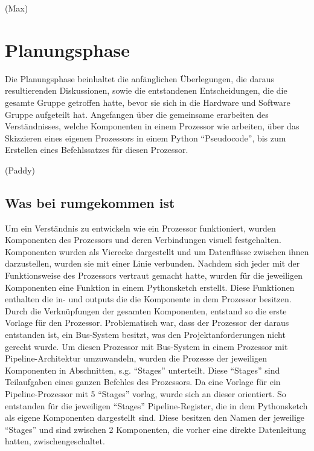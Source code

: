 \documentclass[paper=a4,fontsize=12pt,twocolumn]{scrreprt}
\begin{document}

(Max)

\chapter{Planungsphase}
\label{chap:Planungsphase}

Die Planungsphase beinhaltet die anfänglichen Überlegungen, die daraus resultierenden Diskussionen, sowie die entstandenen Entscheidungen, die die gesamte Gruppe getroffen hatte, bevor sie sich in die Hardware und Software Gruppe aufgeteilt hat.
Angefangen über die gemeinsame erarbeiten des Verständnisses, welche Komponenten in einem Prozessor wie arbeiten, über das Skizzieren eines eigenen Prozessors in einem Python \enquote{Pseudocode}, bis zum Erstellen eines Befehlssatzes für diesen Prozessor.



(Paddy)

\section{Was bei rumgekommen ist}

Um ein Verständnis zu entwickeln wie ein Prozessor funktioniert, wurden Komponenten des Prozessors und deren Verbindungen visuell festgehalten.
Komponenten wurden als Vierecke dargestellt und um Datenflüsse zwischen ihnen darzustellen, wurden sie mit einer Linie verbunden.
Nachdem sich jeder mit der Funktionsweise des Prozessors vertraut gemacht hatte, wurden für die jeweiligen Komponenten eine Funktion in einem Pythonsketch erstellt.
Diese Funktionen enthalten die in- und outputs die die Komponente in dem Prozessor besitzen.
Durch die Verknüpfungen der gesamten Komponenten, entstand so die erste Vorlage für den Prozessor. 
Problematisch war, dass der Prozessor der daraus entstanden ist, ein Bus-System besitzt, was den Projektanforderungen nicht gerecht wurde. 
Um diesen Prozessor mit Bus-System in einem Prozessor mit Pipeline-Architektur umzuwandeln, wurden die Prozesse der jeweiligen Komponenten in Abschnitten, s.g. \enquote{Stages} unterteilt.
Diese \enquote{Stages} sind Teilaufgaben eines ganzen Befehles des Prozessors. 
Da eine Vorlage für ein Pipeline-Prozessor mit 5 \enquote{Stages} vorlag, wurde sich an dieser orientiert.
So entstanden für die jeweiligen \enquote{Stages} Pipeline-Register, die in dem Pythonsketch als eigene Komponenten dargestellt sind.
Diese besitzen den Namen der jeweilige \enquote{Stages} und sind zwischen 2 Komponenten, die vorher eine direkte Datenleitung hatten, zwischengeschaltet.
\end{document}
